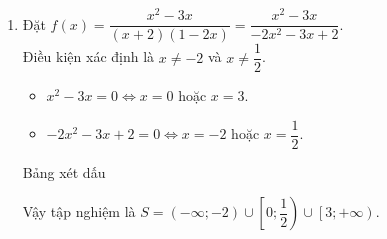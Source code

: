 \begin{bt}
{\begin{enumerate}
\begin{center}
            \end{center}
      	Vậy tập nghiệm là $S=\left(- \infty;-\dfrac{1}{2}\right)\cup\left(3;+\infty\right)$.
		\item Đặt $f(x)=\dfrac{x^2 - 3x}{(x + 2)\left(1 - 2x\right)}=\dfrac{x^2 - 3x}{-2x^2-3x+2}$.\\
		Điều kiện xác định là $x \ne -2$ và $x \ne \dfrac{1}{2}$.
		\begin{itemize}
			\item $x^2 - 3x=0\Leftrightarrow x=0$ hoặc $x=3$.
			\item $- 2x^2 - 3x + 2=0\Leftrightarrow x= - 2$ hoặc $x=\dfrac{1}{2}$.
		\end{itemize}
		Bảng xét dấu
		\begin{center}
    	\end{center}
		Vậy tập nghiệm là $S=\left(- \infty; - 2\right)\cup \left[0; \dfrac{1}{2}\right)\cup \left[3; + \infty\right)$.
	\end{enumerate}
}
\end{bt}

